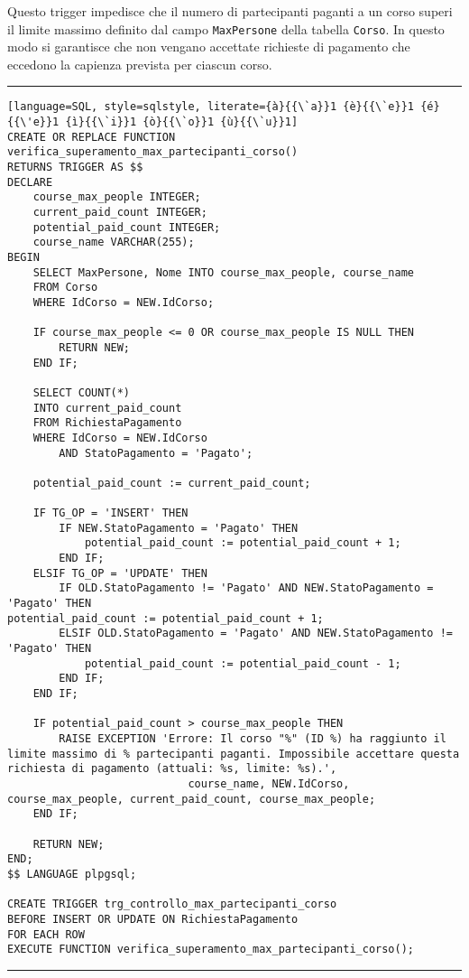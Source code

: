 Questo trigger impedisce che il numero di partecipanti paganti a un corso superi il limite massimo definito dal campo \texttt{MaxPersone} della tabella \texttt{Corso}. In questo modo si garantisce che non vengano accettate richieste di pagamento che eccedono la capienza prevista per ciascun corso.

\noindent\rule{\textwidth}{0.4pt}
\begin{lstlisting}[language=SQL, style=sqlstyle, literate={à}{{\`a}}1 {è}{{\`e}}1 {é}{{\'e}}1 {ì}{{\`i}}1 {ò}{{\`o}}1 {ù}{{\`u}}1]
CREATE OR REPLACE FUNCTION verifica_superamento_max_partecipanti_corso()
RETURNS TRIGGER AS $$
DECLARE
    course_max_people INTEGER;
    current_paid_count INTEGER;
    potential_paid_count INTEGER;
    course_name VARCHAR(255);
BEGIN
    SELECT MaxPersone, Nome INTO course_max_people, course_name
    FROM Corso
    WHERE IdCorso = NEW.IdCorso;

    IF course_max_people <= 0 OR course_max_people IS NULL THEN
        RETURN NEW;
    END IF;

    SELECT COUNT(*)
    INTO current_paid_count
    FROM RichiestaPagamento
    WHERE IdCorso = NEW.IdCorso
        AND StatoPagamento = 'Pagato';

    potential_paid_count := current_paid_count;

    IF TG_OP = 'INSERT' THEN
        IF NEW.StatoPagamento = 'Pagato' THEN
            potential_paid_count := potential_paid_count + 1;
        END IF;
    ELSIF TG_OP = 'UPDATE' THEN
        IF OLD.StatoPagamento != 'Pagato' AND NEW.StatoPagamento = 'Pagato' THEN
potential_paid_count := potential_paid_count + 1;
        ELSIF OLD.StatoPagamento = 'Pagato' AND NEW.StatoPagamento != 'Pagato' THEN
            potential_paid_count := potential_paid_count - 1;
        END IF;
    END IF;

    IF potential_paid_count > course_max_people THEN
        RAISE EXCEPTION 'Errore: Il corso "%" (ID %) ha raggiunto il limite massimo di % partecipanti paganti. Impossibile accettare questa richiesta di pagamento (attuali: %s, limite: %s).',
                            course_name, NEW.IdCorso, course_max_people, current_paid_count, course_max_people;
    END IF;

    RETURN NEW;
END;
$$ LANGUAGE plpgsql;

CREATE TRIGGER trg_controllo_max_partecipanti_corso
BEFORE INSERT OR UPDATE ON RichiestaPagamento
FOR EACH ROW
EXECUTE FUNCTION verifica_superamento_max_partecipanti_corso();
\end{lstlisting}
\noindent\rule{\textwidth}{0.4pt}


